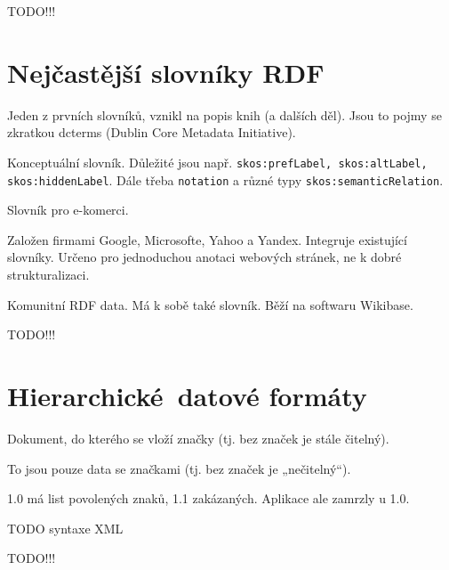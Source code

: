\documentclass[12pt]{article}					%
\begin{document}
TODO!!!


\section{Nejčastější slovníky RDF}
\begin{definice}
	Jeden z prvních slovníků, vznikl na popis knih (a dalších děl). Jsou to pojmy se zkratkou dcterms (Dublin Core Metadata Initiative).
\end{definice}

\begin{definice}[skos]
	Konceptuální slovník. Důležité jsou např. \verb|skos:prefLabel, skos:altLabel, skos:hiddenLabel|. Dále třeba \verb|notation| a různé typy \verb|skos:semanticRelation|.
\end{definice}

\begin{definice}[GoodRelations]
	Slovník pro e-komerci.
\end{definice}

\begin{definice}
	Založen firmami Google, Microsofte, Yahoo a Yandex. Integruje existující slovníky. Určeno pro jednoduchou anotaci webových stránek, ne k dobré strukturalizaci.
\end{definice}

\begin{definice}[Wikidata]
	Komunitní RDF data. Má k sobě také slovník. Běží na softwaru Wikibase.
\end{definice}

TODO!!!



\section{Hierarchické datové formáty}
\begin{definice}
	Dokument, do kterého se vloží značky (tj. bez značek je stále čitelný).
\end{definice}

\begin{definice}
	To jsou pouze data se značkami (tj. bez značek je „nečitelný“).
\end{definice}

\begin{definice}
	1.0 má list povolených znaků, 1.1 zakázaných. Aplikace ale zamrzly u 1.0.
\end{definice}

TODO syntaxe XML


TODO!!!
\end{document}
